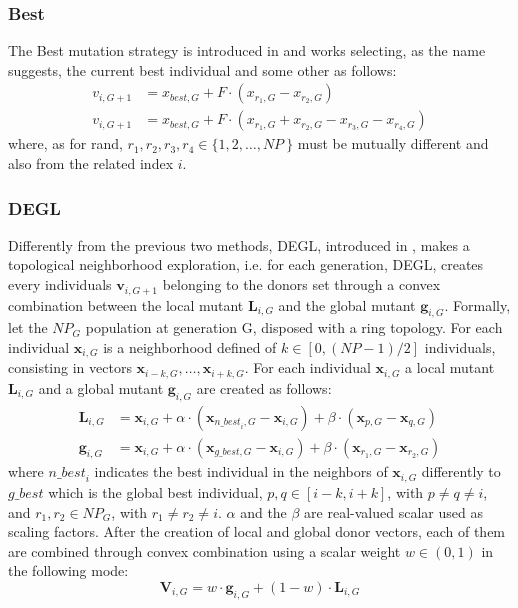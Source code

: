 \subsubsection{Best}
The Best mutation strategy is introduced in \cite{DESEHGOCS:1997} and works selecting, as the name suggests, the current best individual and some other as follows:
\begin{align}
	v_{i, G + 1} &= x_{\textit{best}, G} + F \cdot (x_{r_1, G} - x_{r_2, G}) \\
	v_{i, G + 1} &= x_{\textit{best}, G} + F \cdot (x_{r_1, G} + x_{r_2, G} - x_{r_3, G} - x_{r_4, G})
\end{align}
where, as for rand, $r_1, r_2, r_3, r_4 \in \{1, 2, \dots, \textit{NP}\ \}$ must be mutually different and also from the related index $i$.

\subsubsection{DEGL}
Differently from the previous two methods, DEGL, introduced in \cite{DEGL:2009}, makes a topological neighborhood exploration, i.e. for each generation, DEGL, creates every individuals $\textbf{v}_{i, G + 1}$ belonging to the donors set through a convex combination between the local mutant $\textbf{L}_{i, G}$ and the global mutant $\textbf{g}_{i, G}$.\newline\newline
Formally, let the $\textit{NP}_G$ population at generation G, disposed with a ring topology. For each individual $\textbf{x}_{i, G}$ is a neighborhood defined of $k \in [0, (\textit{NP} - 1) / 2]$ individuals, consisting in vectors $\textbf{x}_{i - k, G}, \dots, \textbf{x}_{i + k, G}$. 
For each individual $\textbf{x}_{i, G}$ a local mutant $\textbf{L}_{i, G}$ and a global mutant $\textbf{g}_{i, G}$ are created as follows:
\begin{align}
	\textbf{L}_{i, G} &= \textbf{x}_{i, G} + \alpha \cdot (\textbf{x}_{\textit{n\_best}_i, G} - \textbf{x}_{i, G}) + \beta \cdot (\textbf{x}_{p, G} - \textbf{x}_{q, G}) \\
	\textbf{g}_{i, G} &= \textbf{x}_{i, G} + \alpha \cdot (\textbf{x}_{\textit{g\_best}, G} - \textbf{x}_{i, G}) + \beta \cdot (\textbf{x}_{r_1, G} - \textbf{x}_{r_2, G})
\end{align}
where $\textit{n\_best}_i$ indicates the best individual in the neighbors of $\textbf{x}_{i, G}$ differently to $\textit{g\_best}$ which is the global best individual, $p, q \in [i - k, i + k]$, with $p \neq q \neq i$, and $r_1, r_2 \in NP_{G}$, with $r_1 \neq r_2 \neq i$. $\alpha$ and the $\beta$ are real-valued scalar used as scaling factors.\newline\newline
After the creation of local and global donor vectors, each of them are combined through convex combination using a scalar weight $w \in (0, 1)$ in the following mode:
\begin{equation}
	\textbf{V}_{i, G} = w \cdot \textbf{g}_{i, G} + (1 - w) \cdot \textbf{L}_{i, G}
\end{equation}


